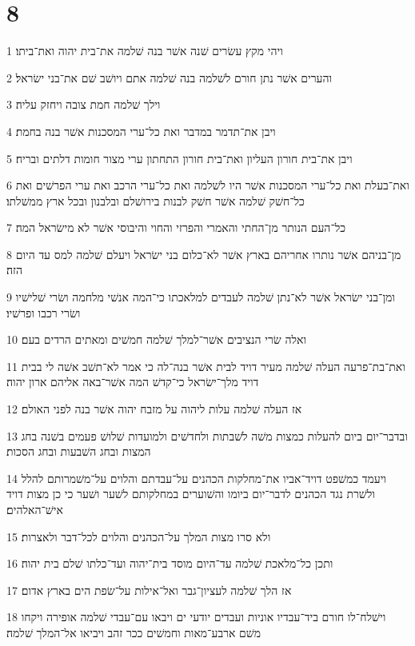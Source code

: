 \chapter{8}

\par 1 ויהי מקץ עשׂרים שׁנה אשׁר בנה שׁלמה את־בית יהוה ואת־ביתו׃
\par 2 והערים אשׁר נתן חורם לשׁלמה בנה שׁלמה אתם ויושׁב שׁם את־בני ישׂראל׃
\par 3 וילך שׁלמה חמת צובה ויחזק עליה׃
\par 4 ויבן את־תדמר במדבר ואת כל־ערי המסכנות אשׁר בנה בחמת׃
\par 5 ויבן את־בית חורון העליון ואת־בית חורון התחתון ערי מצור חומות דלתים ובריח׃
\par 6 ואת־בעלת ואת כל־ערי המסכנות אשׁר היו לשׁלמה ואת כל־ערי הרכב ואת ערי הפרשׁים ואת כל־חשׁק שׁלמה אשׁר חשׁק לבנות בירושׁלם ובלבנון ובכל ארץ ממשׁלתו׃
\par 7 כל־העם הנותר מן־החתי והאמרי והפרזי והחוי והיבוסי אשׁר לא מישׂראל המה׃
\par 8 מן־בניהם אשׁר נותרו אחריהם בארץ אשׁר לא־כלום בני ישׂראל ויעלם שׁלמה למס עד היום הזה׃
\par 9 ומן־בני ישׂראל אשׁר לא־נתן שׁלמה לעבדים למלאכתו כי־המה אנשׁי מלחמה ושׂרי שׁלישׁיו ושׂרי רכבו ופרשׁיו׃
\par 10 ואלה שׂרי הנציבים אשׁר־למלך שׁלמה חמשׁים ומאתים הרדים בעם׃
\par 11 ואת־בת־פרעה העלה שׁלמה מעיר דויד לבית אשׁר בנה־לה כי אמר לא־תשׁב אשׁה לי בבית דויד מלך־ישׂראל כי־קדשׁ המה אשׁר־באה אליהם ארון יהוה׃
\par 12 אז העלה שׁלמה עלות ליהוה על מזבח יהוה אשׁר בנה לפני האולם׃
\par 13 ובדבר־יום ביום להעלות כמצות משׁה לשׁבתות ולחדשׁים ולמועדות שׁלושׁ פעמים בשׁנה בחג המצות ובחג השׁבעות ובחג הסכות׃
\par 14 ויעמד כמשׁפט דויד־אביו את־מחלקות הכהנים על־עבדתם והלוים על־משׁמרותם להלל ולשׁרת נגד הכהנים לדבר־יום ביומו והשׁוערים במחלקותם לשׁער ושׁער כי כן מצות דויד אישׁ־האלהים׃
\par 15 ולא סרו מצות המלך על־הכהנים והלוים לכל־דבר ולאצרות׃
\par 16 ותכן כל־מלאכת שׁלמה עד־היום מוסד בית־יהוה ועד־כלתו שׁלם בית יהוה׃
\par 17 אז הלך שׁלמה לעציון־גבר ואל־אילות על־שׂפת הים בארץ אדום׃
\par 18 וישׁלח־לו חורם ביד־עבדיו אוניות ועבדים יודעי ים ויבאו עם־עבדי שׁלמה אופירה ויקחו משׁם ארבע־מאות וחמשׁים ככר זהב ויביאו אל־המלך שׁלמה׃

